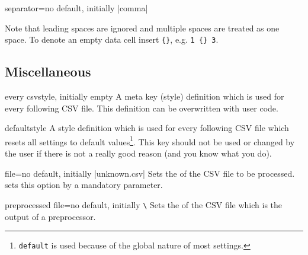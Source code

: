 \documentclass[a4paper,11pt]{ltxdoc}
\begin{document}
\begin{docCsvKey}{separator}{=}{no default, initially |comma|}
\begin{itemize}
\begin{dispExample}
\end{dispExample}
  Note that leading spaces are ignored and multiple spaces are treated as one space.
  To denote an empty data cell insert \verb+{}+, e.g. \verb*+1 {} 3+.
  \end{itemize}
\end{docCsvKey}

\clearpage
\subsection{Miscellaneous}%

\begin{docCsvKey}{every csv}{}{style, initially empty}
  A meta key (style) definition which is used for every following CSV file.
  This definition can be overwritten with user code.
\begin{dispListing}
\end{dispListing}
\end{docCsvKey}

\begin{docCsvKey}{default}{}{style}
  A style definition which is used for every following CSV file which
  resets all settings to default values\footnote{\texttt{default} is used
  because of the global nature of most settings.}.
  This key should not be used or changed by the user if there is not a
  really good reason (and you know what you do).
\end{docCsvKey}


\begin{docCsvKey}{file}{=}{no default, initially |unknown.csv|}
  Sets the  of the CSV file to be processed.
   sets this option by a mandatory parameter.
\end{docCsvKey}


\begin{docCsvKey}{preprocessed file}{=}{no default, initially \texttt{\textbackslash{}}}
  Sets the  of the CSV file which is the output of a
  preprocessor.
\end{docCsvKey}
\end{document}
